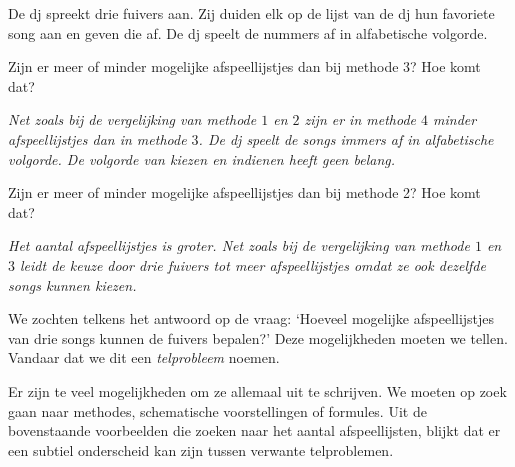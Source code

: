 De dj spreekt drie fuivers aan. Zij duiden elk op de lijst van de dj hun favoriete song aan en geven die af. De dj speelt de nummers af in alfabetische volgorde.

\begin{werktekstoef}

\setcounter{enumi}{9} 

\item{Zijn er meer of minder mogelijke afspeellijstjes dan bij methode 3? Hoe komt dat?}

\emph{Net zoals bij de vergelijking van methode $1$ en $2$ zijn er in methode $4$ minder afspeellijstjes dan in methode $3$. De dj speelt de songs immers af in alfabetische volgorde. De volgorde van kiezen en indienen heeft geen belang.}

\item{Zijn er meer of minder mogelijke afspeellijstjes dan bij methode 2? Hoe komt dat?}

\emph{Het aantal afspeellijstjes is groter. Net zoals bij de vergelijking van methode $1$ en $3$ leidt de keuze door drie fuivers tot meer afspeellijstjes omdat ze ook dezelfde songs kunnen kiezen.}
\end{werktekstoef}

We zochten telkens het antwoord op de vraag: ‘Hoeveel mogelijke afspeellijstjes van drie songs kunnen de fuivers bepalen?’ Deze mogelijkheden moeten we tellen. Vandaar dat we dit een \emph{telprobleem} noemen. 

Er zijn te veel mogelijkheden om ze allemaal uit te schrijven. We moeten op zoek gaan naar methodes, schematische voorstellingen of formules. Uit de bovenstaande voorbeelden die zoeken naar het aantal afspeellijsten, blijkt dat er een subtiel onderscheid kan zijn tussen verwante telproblemen.



